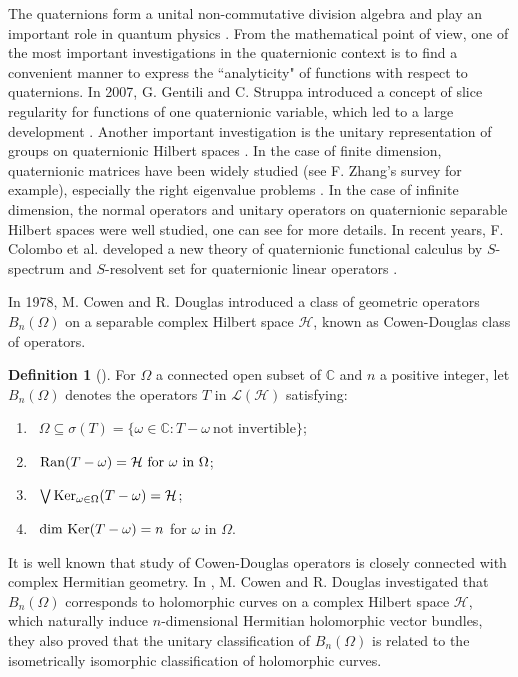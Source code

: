 \documentclass[pdflatex,sn-mathphys-num]{sn-jnl}%
\theoremstyle{thmstyleone}%
\theoremstyle{thmstyletwo}%
\theoremstyle{thmstylethree}%
\newtheorem{definition}{Definition}%
\theoremstyle{definition}
\newtheorem{definition}[theorem]{Definition}
\theoremstyle{remark}
\begin{document}
The quaternions form a unital non-commutative division algebra and play an important role in quantum physics \cite{AF, FJSS, E, HB}. From the
mathematical point of view, one of the most important investigations in the quaternionic context is to find a convenient manner to express the
``analyticity" of functions with respect to quaternions. In 2007, G. Gentili and C. Struppa \cite{GS} introduced a concept of slice regularity for functions of one quaternionic variable, which led to a large development \cite{CSS, GP}. Another important investigation is the unitary representation of groups on quaternionic
Hilbert spaces \cite{FJS, NV}. In the case of finite dimension, quaternionic matrices have been widely studied \cite{L, W} (see F. Zhang's survey \cite{Z} for example), especially the right eigenvalue problems \cite{LS, LSS}. In the case of infinite dimension, the normal operators and unitary
operators on quaternionic separable Hilbert spaces were well studied, one can see \cite{CCKS, RK, SC, V} for more details.
In recent years, F. Colombo et al. developed a new theory of quaternionic functional calculus by  $S$-spectrum and $S$-resolvent set for quaternionic linear operators \cite{CSS}.

In 1978, M. Cowen and R. Douglas \cite{CD} introduced a class of geometric operators $B_n(\Omega)$ on a separable complex Hilbert space $\mathcal {H}$, known as Cowen-Douglas class of operators.

\begin{definition}[\cite{CD}]
	For $\Omega$ a connected open subset of $\mathbb{C}$ and $n$ a
	positive integer, let ${B}_{n}(\Omega)$ denotes the
	operators $T$ in $\mathcal {L}(\mathcal {H})$  satisfying:
	\begin{enumerate}
		\item[(a)] \ $\Omega \subseteq \sigma(T)=\{\omega \in \mathbb{C}: T-\omega \
	\text{not  invertible}\}$;
	
\item[(b)] \ ${\rm Ran}(T-\omega)=\mathcal {H} \ \text{for} \ \omega \ \text{in} \ \Omega$;
	
\item[(c)] \ $\bigvee {\rm Ker}_{\omega\in \Omega}(T-\omega)=\mathcal {H}$;
	
	\item[(d)] \ ${\rm dim \ Ker}(T-\omega)=n$ for $\omega$ in $\Omega$.
		\end{enumerate}
\end{definition}
It is well known that study of Cowen-Douglas operators is closely connected with  complex Hermitian geometry. In \cite{CD}, M. Cowen and R. Douglas investigated that
$B_{n}(\Omega)$ corresponds to holomorphic curves on a complex Hilbert space $\mathcal {H}$, which naturally induce $n$-dimensional Hermitian holomorphic vector bundles, they also
proved that the unitary classification of $B_n(\Omega)$ is related to the isometrically isomorphic classification of holomorphic curves.
\end{document}
